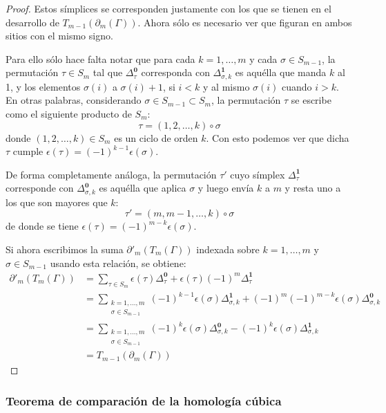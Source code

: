 \documentclass[12pt,a4paper,twoside]{article} %
\theoremstyle{plain}
\theoremstyle{definition}
\begin{document}
\begin{proof}
Estos símplices se corresponden justamente con los que se tienen en el desarrollo de $T_{m-1} \left( \partial_m (\Gamma) \right)$. Ahora sólo es necesario ver que figuran en ambos sitios con el mismo signo.

Para ello sólo hace falta notar que para cada $k=1,\dots,m$ y cada $\sigma \in S_{m-1}$, la permutación $\tau \in S_m$ tal que $\Delta_\tau^{\bm{0}}$ corresponda con $\Delta_{\sigma,k}^{\bm{1}}$ es aquélla que manda $k$ al 1, y los elementos $\sigma(i)$ a $\sigma(i)+1$, si $i<k$ y al mismo $\sigma(i)$ cuando $i > k$. En otras palabras, considerando $\sigma \in S_{m-1} \subset S_m$, la permutación $\tau$ se escribe como el siguiente producto de $S_m$:
$$ \tau = (1,2,\dots,k) \circ \sigma $$
donde $(1,2,\dots,k) \in S_m$ es un ciclo de orden $k$. Con esto podemos ver que dicha $\tau$ cumple $\epsilon(\tau)=(-1)^{k-1}\epsilon(\sigma)$.

De forma completamente análoga, la permutación $\tau'$ cuyo símplex $\Delta_\tau^{\bm{1}}$ corresponde con $\Delta_{\sigma,k}^{\bm{0}}$ es aquélla que aplica $\sigma$ y luego envía $k$ a $m$ y resta uno a los que son mayores que $k$: 
$$ \tau' = (m,m-1,\dots,k) \circ \sigma $$
de donde se tiene $\epsilon(\tau) = (-1)^{m-k} \epsilon(\sigma)$. 

Si ahora escribimos la suma $\partial'_m ( T_m (\Gamma) )$ indexada sobre $k=1,\dots,m$ y $\sigma \in S_{m-1}$ usando esta relación, se obtiene:
\begin{align*}
\partial'_m \left( T_m (\Gamma) \right) &= \sum_{\tau \in S_m} \epsilon(\tau) \Delta_\tau^{\bm{0}} + \epsilon(\tau) (-1)^m \Delta_\tau^{\bm{1}} \\
                                        &= \sum_{\substack{k=1,\dots,m \\ \sigma \in S_{m-1}}} (-1)^{k-1} \epsilon(\sigma) \Delta_{\sigma,k}^{\bm{1}} + (-1)^m(-1)^{m-k} \epsilon(\sigma) \Delta_{\sigma,k}^{\bm{0}} \\
                                        &= \sum_{\substack{k=1,\dots,m \\ \sigma \in S_{m-1}}} (-1)^{k} \epsilon(\sigma) \Delta_{\sigma,k}^{\bm{0}} - (-1)^k \epsilon(\sigma) \Delta_{\sigma,k}^{\bm{1}} \\
                                        &= T_{m-1} \left( \partial_m (\Gamma) \right)
\end{align*}
\end{proof}

\subsubsection{Teorema de comparación de la homología cúbica}
\end{document}
